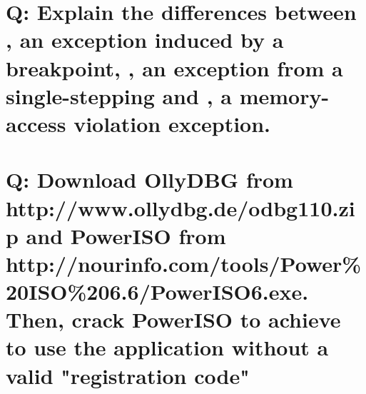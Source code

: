 \documentclass[10pt,a4paper]{article} %
\begin{document}
    \section{Q: Explain the differences between , an exception induced by a
    breakpoint, , an exception from a single-stepping and , a
    memory-access violation exception.}




    \section{Q: Download OllyDBG from http://www.ollydbg.de/odbg110.zip and
    PowerISO from
    http://nourinfo.com/tools/Power\%20ISO\%206.6/PowerISO6.exe. Then, crack
    PowerISO to achieve to use the application without a valid "registration
    code"}
























    \nocite{*}
    
    
\end{document}
